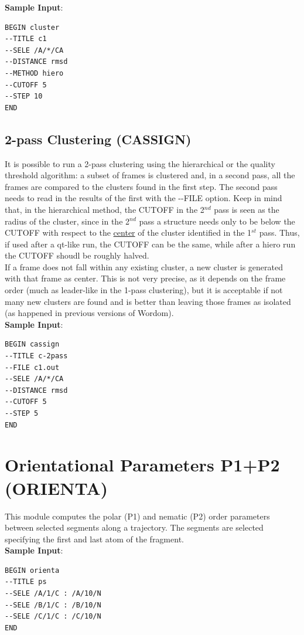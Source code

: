 \documentclass[11pt,twoside,onecolumn,a4paper,openright,notitlepage]{book}[2001/04/21]
\begin{document}
\textbf{\large Sample Input}:
\begin{verbatim}
BEGIN cluster
--TITLE c1
--SELE /A/*/CA
--DISTANCE rmsd
--METHOD hiero
--CUTOFF 5
--STEP 10
END
\end{verbatim}

\subsection{2-pass Clustering (CASSIGN)}
It is possible to run a 2-pass clustering using the hierarchical or the quality threshold algorithm: a subset of frames is clustered and, in a second pass, all the frames are compared to the clusters found in the first step. The second pass needs to read in the results of the first with the -{}-FILE option. Keep in mind that, in the hierarchical method, the CUTOFF in the 2$^{nd}$ pass is seen as the radius of the cluster, since in the 2$^{nd}$ pass a structure needs only to be below the CUTOFF with respect to the \underline{center} of the cluster identified in the 1$^{st}$ pass. Thus, if used after a qt-like run, the CUTOFF can be the same, while after a hiero run the CUTOFF shoudl be roughly halved.\\
If a frame does not fall within any existing cluster, a new cluster is generated with that frame as center. This is not very precise, as it depends on the frame order (much as leader-like in the 1-pass clustering), but it is acceptable if not many new clusters are found and is better than leaving those frames as isolated (as happened in previous versions of Wordom).\\

\textbf{\large Sample Input}:
\begin{verbatim}
BEGIN cassign
--TITLE c-2pass
--FILE c1.out
--SELE /A/*/CA
--DISTANCE rmsd
--CUTOFF 5
--STEP 5
END
\end{verbatim}
\clearpage

\section{Orientational Parameters P1+P2 (ORIENTA)}
This module computes the polar (P1) and nematic (P2) order parameters\cite{cecchini:amyloid} between selected segments along a trajectory. The segments are selected specifying the first and last atom of the fragment.\\

\textbf{\large Sample Input}:
\begin{verbatim}
BEGIN orienta
--TITLE ps
--SELE /A/1/C : /A/10/N
--SELE /B/1/C : /B/10/N
--SELE /C/1/C : /C/10/N
END
\end{verbatim}
\end{document}
